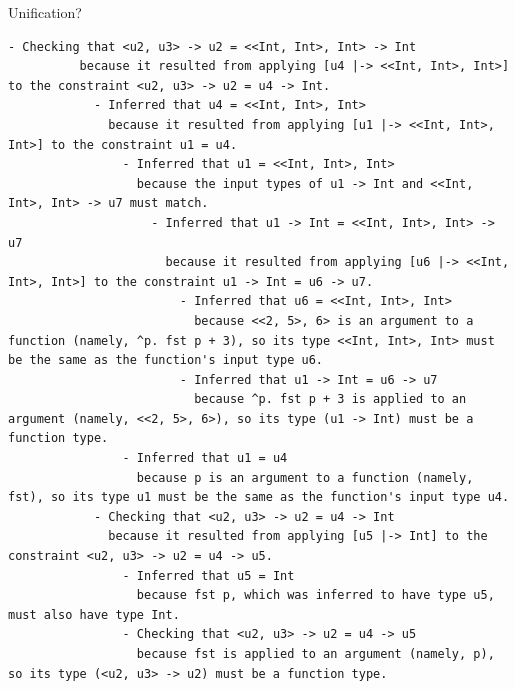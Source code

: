 \documentclass[xcolor=svgnames,12pt,aspectratio=169]{beamer}
\newenvironment{xframe}[1][]
  {\begin{frame}[fragile,environment=xframe,#1]}
  {\end{frame}}
\begin{document}
\begin{xframe}{Unification?}
\begin{Verbatim}[fontsize=\TINY]
        - Checking that <u2, u3> -> u2 = <<Int, Int>, Int> -> Int
          because it resulted from applying [u4 |-> <<Int, Int>, Int>] to the constraint <u2, u3> -> u2 = u4 -> Int.
            - Inferred that u4 = <<Int, Int>, Int>
              because it resulted from applying [u1 |-> <<Int, Int>, Int>] to the constraint u1 = u4.
                - Inferred that u1 = <<Int, Int>, Int>
                  because the input types of u1 -> Int and <<Int, Int>, Int> -> u7 must match.
                    - Inferred that u1 -> Int = <<Int, Int>, Int> -> u7
                      because it resulted from applying [u6 |-> <<Int, Int>, Int>] to the constraint u1 -> Int = u6 -> u7.
                        - Inferred that u6 = <<Int, Int>, Int>
                          because <<2, 5>, 6> is an argument to a function (namely, ^p. fst p + 3), so its type <<Int, Int>, Int> must be the same as the function's input type u6.
                        - Inferred that u1 -> Int = u6 -> u7
                          because ^p. fst p + 3 is applied to an argument (namely, <<2, 5>, 6>), so its type (u1 -> Int) must be a function type.
                - Inferred that u1 = u4
                  because p is an argument to a function (namely, fst), so its type u1 must be the same as the function's input type u4.
            - Checking that <u2, u3> -> u2 = u4 -> Int
              because it resulted from applying [u5 |-> Int] to the constraint <u2, u3> -> u2 = u4 -> u5.
                - Inferred that u5 = Int
                  because fst p, which was inferred to have type u5, must also have type Int.
                - Checking that <u2, u3> -> u2 = u4 -> u5
                  because fst is applied to an argument (namely, p), so its type (<u2, u3> -> u2) must be a function type.
\end{Verbatim}
\end{xframe}
\end{document}
